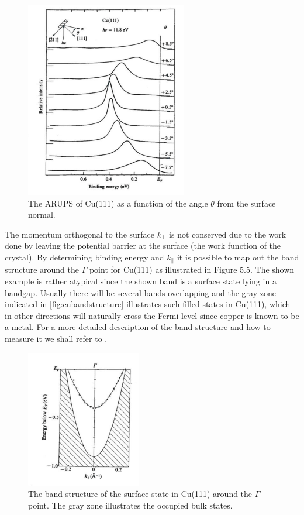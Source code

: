 \begin{figure}[h!]
	\begin{center}
	\includegraphics[scale=4]{figures/05_04.png}
	\caption{The ARUPS of Cu(111) as a function of the angle $\theta$ from the surface normal.}
	\label{fig:cuarups}
	\end{center}
\end{figure}

The momentum orthogonal to the surface $k_{\perp}$ is not conserved due to the work done by leaving the potential barrier at the surface (the work function of the crystal). By determining binding energy and $k_\parallel$ it is possible to map out the band structure around the $\Gamma$ point for Cu(111) as illustrated in Figure 5.5. The shown example is rather atypical since the shown band is a surface state lying in a bandgap. Usually there will be several bands overlapping and the gray zone indicated in \autoref{fig:cubandstructure} illustrates such  filled states in Cu(111), which in other directions will naturally cross the Fermi level since copper is known to be a metal. For a more detailed description of the band structure and how to measure it  we shall refer to \cite{Neddermeyer, Kevan}.

\begin{figure}[h!]
	\begin{center}
	\includegraphics[scale=4]{figures/05_05.png}
	\caption{The band structure of the surface state in Cu(111) around the $\Gamma$ point. The gray zone illustrates the occupied bulk states.}
	\label{fig:cubandstructure}
	\end{center}
\end{figure}

